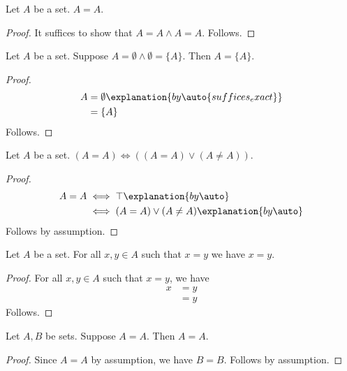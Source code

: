 \begin{proposition}\label{suffices_exact}
    Let $A$ be a set.
    $A=A$.
\end{proposition}
\begin{proof}
    It suffices to show that $A=A\land A=A$.
    Follows.
\end{proof}

\begin{proposition}\label{calculation_equality_exact}
    Let $A$ be a set.
    Suppose $A=\emptyset\land \emptyset=\{A\}$.
    Then $A=\{A\}$.
\end{proposition}
\begin{proof}
    \begin{align*}
        A
            &= \emptyset
                \explanation{by \auto{suffices_exact}}
            \\
            &= \{A\}
    \end{align*}
    Follows.
\end{proof}

\begin{proposition}\label{calculation_biconditional_exact}
    Let $A$ be a set.
    $(A=A)\iff ((A=A)\lor(A\neq A))$.
\end{proposition}
\begin{proof}
    \begin{align*}
        A=A
            &\iff \top
                \explanation{by \auto}
                \\
            &\iff (A=A)\lor(A\neq A)
                \explanation{by \auto}
    \end{align*}
    Follows by assumption.
\end{proof}

\begin{proposition}\label{calculation_quantified_exact}
    Let $A$ be a set.
    For all $x,y\in A$ such that $x=y$ we have $x=y$.
\end{proposition}
\begin{proof}
    For all $x,y\in A$ such that $x=y$, we have
    \begin{align*}
        x
            &= y
            \\
            &= y
    \end{align*}
    Follows.
\end{proof}

\begin{proposition}\label{since_structural_exact}
    Let $A,B$ be sets.
    Suppose $A=A$.
    Then $A=A$.
\end{proposition}
\begin{proof}
    Since $A=A$ by assumption, we have $B=B$.
    Follows by assumption.
\end{proof}

